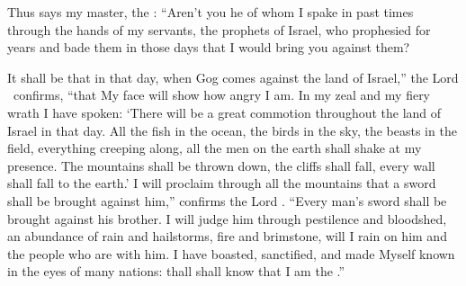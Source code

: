 
\begin{inparaenum}
  
  
  
   Thus says my master, the \lord: ``Aren't you he of whom I spake in past times through the hands of my servants, the prophets of Israel, who prophesied for years and bade them in those days that I would bring you against them?%
  
   It shall be that in that day, when Gog comes against the land of Israel,'' the Lord \god\ confirms, ``that My face will show how angry I am.%
   In my zeal and my fiery wrath I have spoken: `There will be a great commotion throughout the land of Israel in that day.%
   All the fish in the ocean, the birds in the sky, the beasts in the field, everything creeping along, all the men on the earth shall shake at my presence. The mountains shall be thrown down, the cliffs shall fall, every wall shall fall to the earth.'%
   I will proclaim through all the mountains that a sword shall be brought against him,'' confirms the Lord \god. ``Every man's sword shall be brought against his brother.%
   I will judge him through pestilence and bloodshed, an abundance of rain and hailstorms, fire and brimstone, will I rain on him and the people who are with him.%
   I have boasted, sanctified, and made Myself known in the eyes of many nations: thall shall know that I am the \lord.''%
\end{inparaenum}
